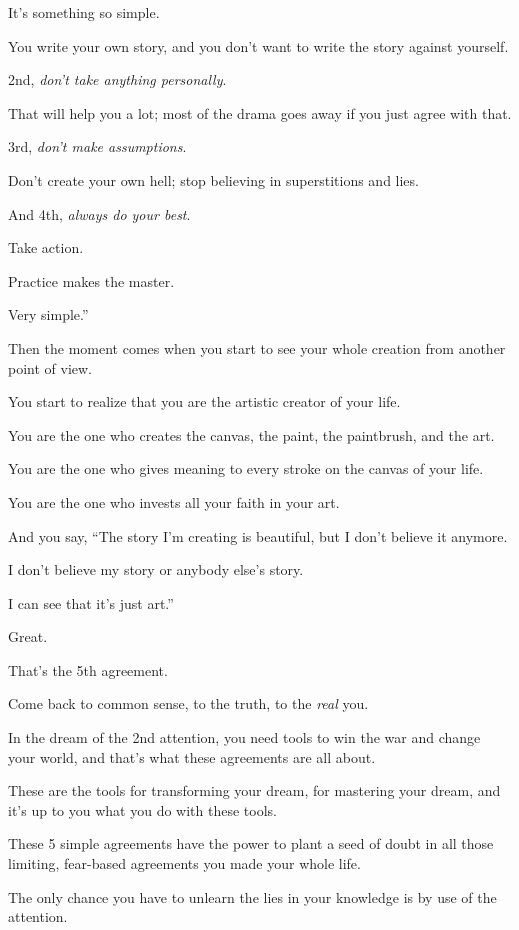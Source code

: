 \documentclass{article}
\numberwithin{equation}{section}
\begin{document}
It's something so simple.

You write your own story, and you don't want to write the story against yourself.

2nd, \textit{don't take anything personally}.

That will help you a lot; most of the drama goes away if you just agree with that.

3rd, \textit{don't make assumptions}.

Don't create your own hell; stop believing in superstitions and lies.

And 4th, \textit{always do your best}.

Take action.

Practice makes the master.

Very simple.''

Then the moment comes when you start to see your whole creation from another point of view.

You start to realize that you are the artistic creator of your life.

You are the one who creates the canvas, the paint, the paintbrush, and the art.

You are the one who gives meaning to every stroke on the canvas of your life.

You are the one who invests all your faith in your art.

And you say, ``The story I'm creating is beautiful, but I don't believe it anymore.

I don't believe my story or anybody else's story.

I can see that it's just art.''

Great.

That's the 5th agreement.

Come back to common sense, to the truth, to the \textit{real} you.


%
In the dream of the 2nd attention, you need tools to win the war and change your world, and that's what these agreements are all about.

These are the tools for transforming your dream, for mastering your dream, and it's up to you what you do with these tools.

These 5 simple agreements have the power to plant a seed of doubt in all those limiting, fear-based agreements you made your whole life.

The only chance you have to unlearn the lies in your knowledge is by use of the attention.
\end{document}

